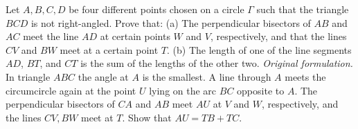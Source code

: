 Let $A, B, C, D$ be four different points chosen on a circle $\Gamma$ such that the triangle $BCD$ is not right-angled. Prove that:
(a) The perpendicular bisectors of $AB$ and $AC$ meet the line $AD$ at certain points $W$ and $V$, respectively, and that the lines $CV$ and $BW$ meet at a certain point $T$.
(b) The length of one of the line segments $AD$, $BT$, and $CT$ is the sum of the lengths of the other two.
\textit{Original formulation.} In triangle $ABC$ the angle at $A$ is the smallest. A line through $A$ meets the circumcircle again at the point $U$ lying on the arc $BC$ opposite to $A$. The perpendicular bisectors of $CA$ and $AB$ meet $AU$ at $V$ and $W$, respectively, and the lines $CV, BW$ meet at $T$. Show that $AU = TB + TC$.
